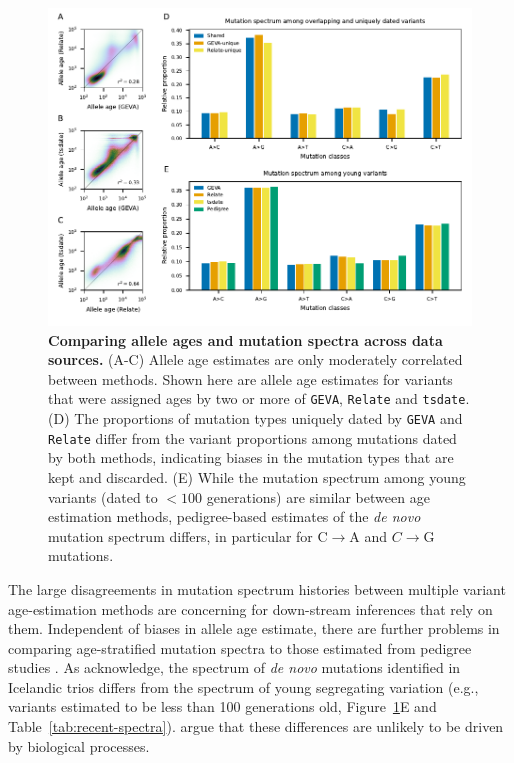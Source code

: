 \documentclass[]{article}
\newcommand{\GEVA}{\texttt{GEVA}\xspace}
\newcommand{\tsdate}{\texttt{tsdate}\xspace}
\newcommand{\relate}{\texttt{Relate}\xspace}
\begin{document}
\begin{figure}[t!]
    \centering
    \includegraphics{../plots/fig2.pdf}
    \caption{
        \textbf{Comparing allele ages and mutation spectra across data
        sources.} (A-C) Allele age estimates are only moderately correlated
        between methods. Shown here are allele age estimates for variants that
        were assigned ages by two or more of \GEVA, \relate and \tsdate. (D)
        The proportions of mutation types uniquely dated by \GEVA and \relate
        differ from the variant proportions among mutations dated by both
        methods, indicating biases in the mutation types that are kept and
        discarded. (E) While the mutation spectrum among young variants (dated
        to $<100$ generations) are similar between age estimation methods,
        pedigree-based estimates of the \emph{de novo} mutation spectrum
        \citep{jonsson2017parental} differs, in particular for C$\rightarrow$A
        and $C\rightarrow$G mutations.
    }
    \label{fig:data-comp}
\end{figure}

The large disagreements in mutation spectrum histories between multiple variant
age-estimation methods are concerning for down-stream inferences that rely on
them. Independent of biases in allele age estimate, there are further problems
in comparing age-stratified mutation spectra to those estimated from pedigree
studies \citep{jonsson2017parental,halldorsson2019characterizing}. As
\citet{wang2023human} acknowledge, the spectrum of \emph{de novo} mutations
identified in Icelandic trios \citep{jonsson2017parental} differs from the
spectrum of young segregating variation (e.g., variants estimated to be less
than 100 generations old, Figure~\ref{fig:data-comp}E and
Table~\ref{tab:recent-spectra}). \citet{gao2022limited} argue that these
differences are unlikely to be driven by biological processes.
\end{document}
